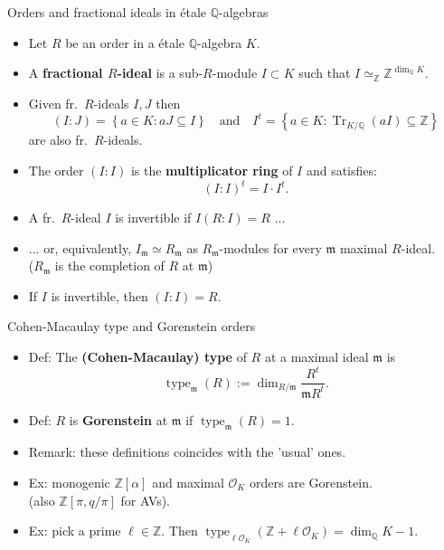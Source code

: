 \documentclass[usenames,dvipsnames,handout]{beamer}
\def\Q{\mathbb{Q}}
\def\Z{\mathbb{Z}}
\DeclareMathOperator{\Tr}{Tr}
\DeclareMathOperator{\type}{type}
\newcommand{\cO}{{\mathcal O}}
\renewcommand{\frm}{{\mathfrak m}}
\newcommand{\set}[1]{\left\lbrace#1\right\rbrace }
\begin{document}
\begin{frame}{ Orders and fractional ideals in \'etale $\Q$-algebras } 
    \begin{itemize}
    \item \pause Let $R$ be an order in a \'etale $\Q$-algebra $K$.
    \item \pause A {\bf fractional $R$-ideal} is a sub-$R$-module $I\subset K$ such that $I\simeq_\Z\Z^{\dim_\Q K}$.
    \item \pause Given fr.~$R$-ideals $I,J$ then 
    $$(I:J)=\set{a \in K : aJ\subseteq I}
    \quad \text{and}\quad I^t=\set{a \in K : \Tr_{K/\Q}(a I)\subseteq \Z}$$
    are also fr.~$R$-ideals.
    \item \pause The order $(I:I)$ is the {\bf multiplicator ring} of $I$ and satisfies: 
    $$(I:I)^t = I\cdot I^t.$$
    \item \pause A fr.~$R$-ideal $I$ is invertible if $I(R:I)=R$ ...
    \item \pause ... or, equivalently, $I_\frm \simeq R_\frm$ as $R_\frm$-modules for every $\frm$ maximal $R$-ideal.\\
        ($R_\frm$ is the completion of $R$ at $\frm$)
    \item \pause If $I$ is invertible, then $(I:I)=R$.
	\end{itemize}
\end{frame}

\begin{frame}{ Cohen-Macaulay type and Gorenstein orders } 
    \begin{itemize}
    \item Def: The {\bf (Cohen-Macaulay) type} of $R$ at a maximal ideal $\frm$ is
        \[ \type_\frm (R) := \dim_{R/\frm} \frac{R^t}{\frm R^t}. \]
    \item \pause Def: $R$ is {\bf Gorenstein} at $\frm$ if $\type_\frm(R)=1$.
    \item \pause Remark: these definitions coincides with the 'usual' ones.
    \item \pause Ex: monogenic $\Z[\alpha]$ and maximal $\cO_K$ orders are Gorenstein.\\
    (also $\Z[\pi,q/\pi]$ for AVs).
    \item \pause Ex: pick a prime $\ell\in\Z$. Then $\type_{\ell\cO_K}(\Z+\ell\cO_K) = \dim_\Q K-1$.
	\end{itemize}
\end{frame}
\end{document}
